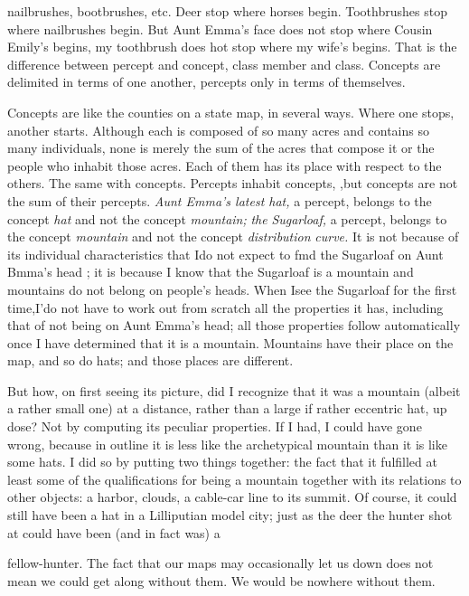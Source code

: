 
nailbrushes, bootbrushes, etc. Deer stop where horses begin. Tooth\-brushes stop where nailbrushes begin. But Aunt Emma's face does not stop where Cousin Emily's begins, my toothbrush does hot stop where my wife's begins. That is the difference between percept and concept, class member and class. Concepts are delimited in terms of one another, percepts only in terms of themselves.

Concepts are like the counties on a state map, in several ways. Where one stops, another starts. Although each is composed of so many acres and contains so many individuals, none is merely the sum of the acres that compose it or the people who inhabit those acres. Each of them has its place with respect to the others. The same with con\-cepts. Percepts inhabit concepts, ,but concepts are not the sum of their percepts. \textit{Aunt Emma's latest hat,} a percept, belongs to the concept \textit{hat} and not the concept \textit{mountain;} \textit{the} \textit{Sugarloaf,} a percept, belongs to the concept \textit{mountain }and not the concept \textit{distribution} \textit{curve.} It is not because of its individual characteristics that Ido not expect to fmd the Sugarloaf on Aunt Bmma's head ; it is because I know that the Sugarloaf is a mountain and mountains do not belong on people's heads. When Isee the Sugarloaf for the first time,I'do not have to work out from scratch all the properties it has, including that of not being on Aunt Emma's head; all those properties follow auto\-matically once I have determined that it is a mountain. Mountains have their place on the map, and so do hats; and those places are different.

But how, on first seeing its picture, did I recognize that it was a mountain (albeit a rather small one) at a distance, rather than a large if rather eccentric hat, up dose? Not by computing its peculiar proper\-ties. If I had, I could have gone wrong, because in outline it is less like the archetypical mountain than it is like some hats. I did so by putting two things together: the fact that it fulfilled at least some of the qualifications for being a mountain together with its relations to other objects: a harbor, clouds, a cable-car line to its summit. Of course, it could still have been a hat in a Lilliputian model city; just as the deer the hunter shot at could have been (and in fact was) a


fellow-hunter. The fact that our maps may occasionally let us down does not mean we could get along without them. We would be no\-where without them.

